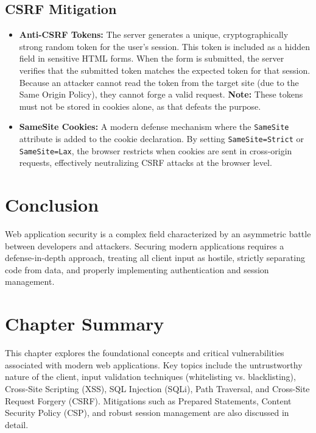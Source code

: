 \subsection{CSRF Mitigation}
\begin{itemize}
    \item \textbf{Anti-CSRF Tokens:} The server generates a unique, cryptographically strong random token for the user's session. This token is included as a hidden field in sensitive HTML forms. When the form is submitted, the server verifies that the submitted token matches the expected token for that session. Because an attacker cannot read the token from the target site (due to the Same Origin Policy), they cannot forge a valid request. \textbf{Note:} These tokens must not be stored in cookies alone, as that defeats the purpose.
    \item \textbf{SameSite Cookies:} A modern defense mechanism where the \texttt{SameSite} attribute is added to the cookie declaration. By setting \texttt{SameSite=Strict} or \texttt{SameSite=Lax}, the browser restricts when cookies are sent in cross-origin requests, effectively neutralizing CSRF attacks at the browser level.
\end{itemize}

\section{Conclusion}
Web application security is a complex field characterized by an asymmetric battle between developers and attackers. Securing modern applications requires a defense-in-depth approach, treating all client input as hostile, strictly separating code from data, and properly implementing authentication and session management.

\section*{Chapter Summary}
This chapter explores the foundational concepts and critical vulnerabilities associated with modern web applications. Key topics include the untrustworthy nature of the client, input validation techniques (whitelisting vs. blacklisting), Cross-Site Scripting (XSS), SQL Injection (SQLi), Path Traversal, and Cross-Site Request Forgery (CSRF). Mitigations such as Prepared Statements, Content Security Policy (CSP), and robust session management are also discussed in detail.

